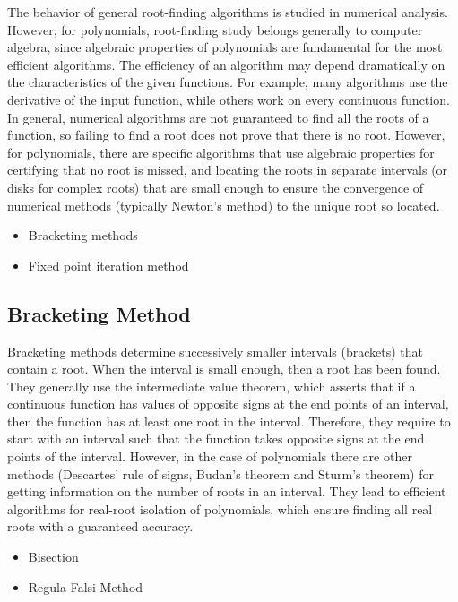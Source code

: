 \documentclass{article}
\begin{document}
The behavior of general root-finding algorithms is studied in numerical analysis. However, for polynomials, root-finding study belongs generally to computer algebra, since algebraic properties of polynomials are fundamental for the most efficient algorithms. The efficiency of an algorithm may depend dramatically on the characteristics of the given functions. For example, many algorithms use the derivative of the input function, while others work on every continuous function. In general, numerical algorithms are not guaranteed to find all the roots of a function, so failing to find a root does not prove that there is no root. However, for polynomials, there are specific algorithms that use algebraic properties for certifying that no root is missed, and locating the roots in separate intervals (or disks for complex roots) that are small enough to ensure the convergence of numerical methods (typically Newton's method) to the unique root so located.
\begin{center}
    \begin{itemize}
        \item Bracketing methods
        \item Fixed point iteration method
    \end{itemize}
\end{center}
\newpage
\subsection{Bracketing Method}
Bracketing methods determine successively smaller intervals (brackets) that contain a root. When the interval is small enough, then a root has been found. They generally use the intermediate value theorem, which asserts that if a continuous function has values of opposite signs at the end points of an interval, then the function has at least one root in the interval. Therefore, they require to start with an interval such that the function takes opposite signs at the end points of the interval. However, in the case of polynomials there are other methods (Descartes' rule of signs, Budan's theorem and Sturm's theorem) for getting information on the number of roots in an interval. They lead to efficient algorithms for real-root isolation of polynomials, which ensure finding all real roots with a guaranteed accuracy.
\begin{center}
    \begin{itemize}
        \item Bisection
        \item Regula Falsi Method
    \end{itemize}
\end{center}
\end{document}

